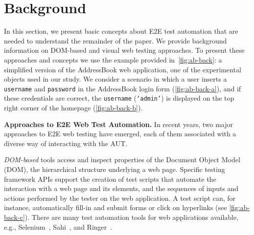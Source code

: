 \section{Background}\label{sec:background}

In this section, we present basic concepts
about E2E test automation that are needed 
to understand the remainder of the paper.
We provide background information on 
DOM-based and visual web testing approaches.
To present these approaches and concepts
we use the example provided in~\autoref{fig:ab-back}: 
a simplified version of the AddressBook web application, 
one of the experimental objects used in our study. 
We consider a scenario in which a user 
inserts a \texttt{username} and \texttt{password} 
in the AddressBook login form 
(\autoref{fig:ab-back-a}), 
and if these credentials are correct, 
the \texttt{username} (\texttt{`admin'}) is displayed on the top right corner of the homepage 
(\autoref{fig:ab-back-b}).

\noindent
\textbf{Approaches to E2E Web Test Automation.}
In recent years, two major approaches to E2E web testing have emerged, each of them associated with a diverse way of interacting with the AUT. 

\textit{DOM-based} tools access and inspect properties of the Document Object Model (DOM), the hierarchical structure underlying a web page. 
Specific testing framework APIs support the creation of test scripts that automate the interaction with a web page and its elements, and the sequences of inputs and actions performed by the tester on the web application. A test script can, for instance, automatically fill-in and submit forms or click on hyperlinks (see \autoref{fig:ab-back-c}). There are many test automation tools for web applications available, e.g., Selenium~\cite{selenium}, Sahi~\cite{sahi}, and Ringer~\cite{ringer}. %

